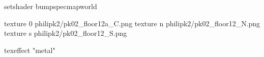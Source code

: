 setshader bumpspecmapworld

texture 0 philipk2/pk02_floor12a_C.png
texture n philipk2/pk02_floor12_N.png
texture s philipk2/pk02_floor12_S.png

texeffect "metal"
